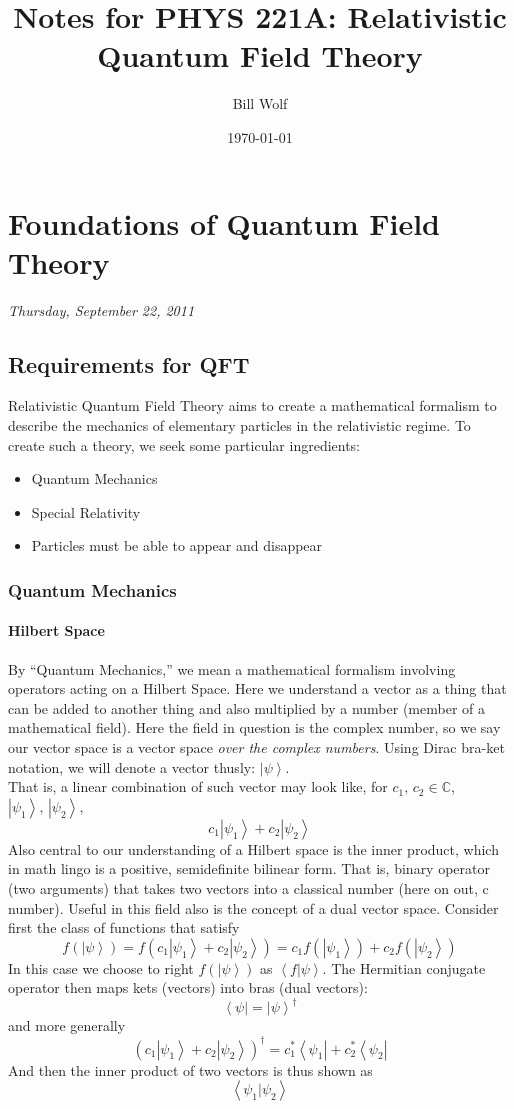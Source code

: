 \documentclass[10pt]{article}
\title{Notes for PHYS 221A: Relativistic Quantum Field Theory}
\author{Bill Wolf}
\date{\today}
\newcommand{\n}{\noindent}
\newcommand{\ket}[1]{\left|#1\right>}
\newcommand{\bra}[1]{\left<#1\right|}
\newcommand{\ip}[2]{\left<#1|#2\right>}
\begin{document}
\vfill\maketitle\vfill \newpage

\tableofcontents \newpage


\section{Foundations of Quantum Field Theory}
	\emph{Thursday, September 22, 2011}
	\subsection{Requirements for QFT}
	Relativistic Quantum Field Theory aims to create a mathematical formalism to describe the mechanics of elementary particles in the relativistic regime. To create such a theory, we seek some particular ingredients:
	\begin{itemize}
		\item Quantum Mechanics
		\item Special Relativity
		\item Particles must be able to appear and disappear
	\end{itemize}
	\subsubsection{Quantum Mechanics}
	\paragraph{Hilbert Space} By ``Quantum Mechanics,'' we mean a mathematical formalism involving operators acting on a Hilbert Space. Here we understand a vector as a thing that can be added to another thing and also multiplied by a number (member of a mathematical field). Here the field in question is the complex number, so we say our vector space is a vector space \emph{over the complex numbers}. Using Dirac bra-ket notation, we will denote a vector thusly: $\ket{\psi}$.\\
	
	\n That is, a linear combination of such vector may look like, for $c_1,\,c_2\in\mathbb{C}$, $\ket{\psi_1},\,\ket{\psi_2}$,
	$$c_1\ket{\psi_1}+c_2\ket{\psi_2}$$
	Also central to our understanding of a Hilbert space is the inner product, which in math lingo is a positive, semidefinite bilinear form. That is, binary operator (two arguments) that takes two vectors into a classical number (here on out, c number). Useful in this field also is the concept of a dual vector space. Consider first the class of functions that satisfy
	$$f\left(\ket{\psi}\right) = f\left(c_1\ket{\psi_1}+c_2\ket{\psi_2}\right) = c_1 f\left(\ket{\psi_1}\right)+c_2 f\left(\ket{\psi_2}\right)$$ 
	In this case we choose to right $f(\ket{\psi})$ as $\ip{f}{\psi}$. The Hermitian conjugate operator then maps kets (vectors) into bras (dual vectors):
	$$\bra{\psi} = \ket{\psi}^\dag$$
	and more generally
	$$\left(c_1\ket{\psi_1}+c_2\ket{\psi_2}\right)^\dag = c_1^*\bra{\psi_1}+c_2^*\bra{\psi_2}$$
	And then the inner product of two vectors is thus shown as
	$$\ip{\psi_1}{\psi_2}$$
\end{document}
